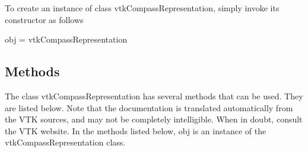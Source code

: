 To create an instance of class vtk\-Compass\-Representation, simply invoke its constructor as follows \begin{DoxyVerb}  obj = vtkCompassRepresentation
\end{DoxyVerb}
 \hypertarget{vtkwidgets_vtkxyplotwidget_Methods}{}\subsection{Methods}\label{vtkwidgets_vtkxyplotwidget_Methods}
The class vtk\-Compass\-Representation has several methods that can be used. They are listed below. Note that the documentation is translated automatically from the V\-T\-K sources, and may not be completely intelligible. When in doubt, consult the V\-T\-K website. In the methods listed below, {\ttfamily obj} is an instance of the vtk\-Compass\-Representation class. 
